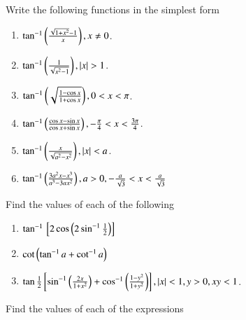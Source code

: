 Write the following functions in the simplest form
\begin{enumerate}[label=\thesubsection.\arabic*,ref=\thesubsection.\theenumi,resume*,itemsep=1ex]
	\item 
		$\tan^{-1}\left(\frac{\sqrt{1+x^2}-1}{x}\right),
x \ne 0$.
	\item 
		$\tan^{-1}\left(\frac{1}{\sqrt{x^2-1}}\right),
		\left\vert x\right\vert > 1$.
	\item 
		$\tan^{-1}\left(\sqrt{\frac{1-\cos x}{1+\cos x}}\right),
		0 < {x} < \pi$.
	\item 
		$\tan^{-1}\left(\frac{\cos x-\sin x}{\cos x+\sin x}\right),
-\frac{\pi}{4} < x < \frac{3\pi}{4}$.
	\item 
		$\tan^{-1}\left(\frac{x}{\sqrt{a^2-x^2}}\right),
		\left\vert x\right\vert < a$.
	\item 
		$\tan^{-1}\left(\frac{3a^2x-x^3}{{a^3-3ax^2}}\right),
		a > 0,
		-\frac{a}{\sqrt{3}} < x < \frac{a}{\sqrt{3}}$
\end{enumerate}
Find the values of each of the following
\begin{enumerate}[label=\thesubsection.\arabic*,ref=\thesubsection.\theenumi,itemsep=1ex]
	\item 
		$\tan^{-1}{}\left[2\cos \left(2\sin^{-1}\frac{1}{2}\right)\right]$
	\item 
		$\cot\left(\tan^{-1}a + \cot^{-1}a\right)$
	\item
		$\tan\frac{1}{2}{}\left[\sin^{-1}\left(\frac{2x}{1+x^2}\right)+\cos^{-1}\left(\frac{1-y^2}{1+y^2}\right)\right],
		\left\vert x\right\vert < 1, y > 0,  xy < 1$.
\end{enumerate}
Find the values of each of the expressions
